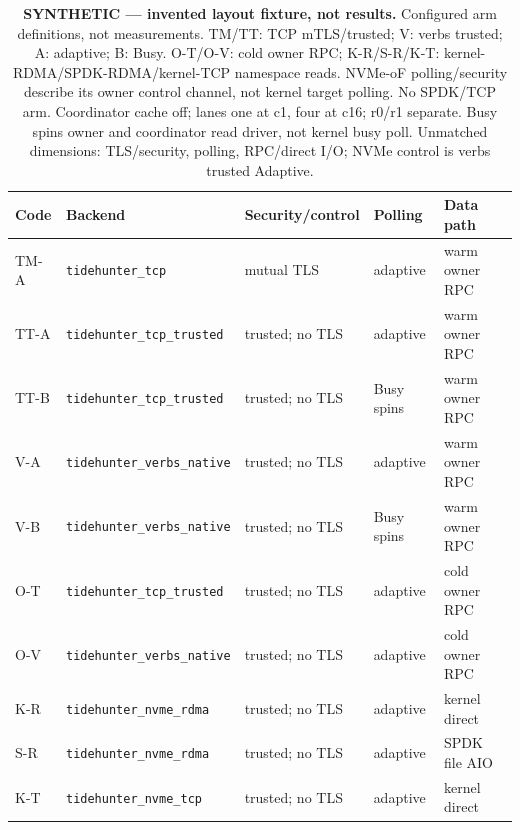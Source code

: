 \begin{table}[H]\centering\small\setlength{\tabcolsep}{3pt}
\begin{tabular}{lllll}\toprule
Code & Backend & Security/control & Polling & Data path\\\midrule
TM-A & \texttt{tidehunter\_tcp} & mutual TLS & adaptive & warm owner RPC\\
TT-A & \texttt{tidehunter\_tcp\_trusted} & trusted; no TLS & adaptive & warm owner RPC\\
TT-B & \texttt{tidehunter\_tcp\_trusted} & trusted; no TLS & Busy spins & warm owner RPC\\
V-A & \texttt{tidehunter\_verbs\_native} & trusted; no TLS & adaptive & warm owner RPC\\
V-B & \texttt{tidehunter\_verbs\_native} & trusted; no TLS & Busy spins & warm owner RPC\\
O-T & \texttt{tidehunter\_tcp\_trusted} & trusted; no TLS & adaptive & cold owner RPC\\
O-V & \texttt{tidehunter\_verbs\_native} & trusted; no TLS & adaptive & cold owner RPC\\
K-R & \texttt{tidehunter\_nvme\_rdma} & trusted; no TLS & adaptive & kernel direct\\
S-R & \texttt{tidehunter\_nvme\_rdma} & trusted; no TLS & adaptive & SPDK file AIO\\
K-T & \texttt{tidehunter\_nvme\_tcp} & trusted; no TLS & adaptive & kernel direct\\
\bottomrule\end{tabular}
\caption{\textbf{SYNTHETIC --- invented layout fixture, not results.} Configured arm definitions, not measurements. TM/TT: TCP mTLS/trusted; V: verbs trusted; A: adaptive; B: Busy. O-T/O-V: cold owner RPC; K-R/S-R/K-T: kernel-RDMA/SPDK-RDMA/kernel-TCP namespace reads. NVMe-oF polling/security describe its owner control channel, not kernel target polling. No SPDK/TCP arm. Coordinator cache off; lanes one at c1, four at c16; r0/r1 separate. Busy spins owner and coordinator read driver, not kernel busy poll. Unmatched dimensions: TLS/security, polling, RPC/direct I/O; NVMe control is verbs trusted Adaptive.}
\end{table}
